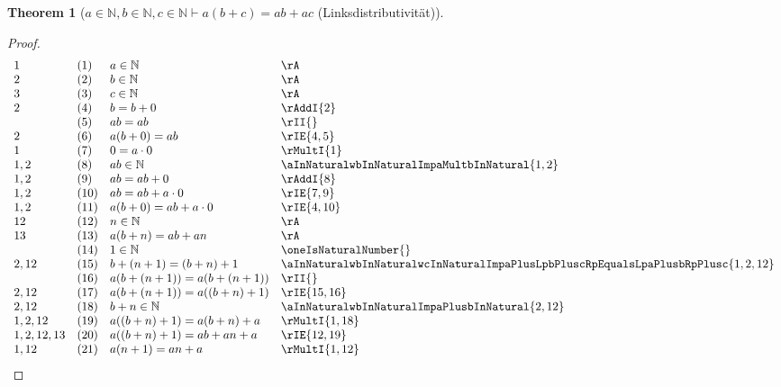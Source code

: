 \documentclass{book}
\theoremstyle{plain}
\newtheorem{theorem}{Theorem}
\theoremstyle{remark}
\theoremstyle{definition}
\begin{document}
\label{aInNaturalwbInNaturalwcInNaturalImpaLpbPluscRpEqualsabPlusac}
\begin{theorem}[\(a\in\mathbb{N},b\in\mathbb{N},c\in\mathbb{N}\vdash a(b+c)=ab+ac\) (Linksdistributivität)]
\end{theorem}
\begin{proof}
        \[
	\begin{array}{llll}
            1           &  (1) & a\in\mathbb{N} & \rA \\
            2           &  (2) & b\in\mathbb{N} & \rA \\
            3           &  (3) & c\in\mathbb{N} & \rA \\
            2           &  (4) & b=b+0 & \rAddI{2} \\
                        &  (5) & ab=ab & \rII{} \\
            2           &  (6) & a(b+0)=ab & \rIE{4,5} \\
            1           &  (7) & 0=a\cdot 0 & \rMultI{1} \\
            1,2         &  (8) & ab\in\mathbb{N} & \aInNaturalwbInNaturalImpaMultbInNatural{1,2} \\
            1,2         &  (9) & ab=ab+0 & \rAddI{8} \\
            1,2         &  (10) & ab=ab+a\cdot 0 & \rIE{7,9} \\
            1,2         &  (11) & a(b+0)=ab+a\cdot 0 & \rIE{4,10} \\
            12          &  (12) & n\in\mathbb{N} & \rA \\
            13          &  (13) & a(b+n)=ab+an & \rA \\
                        &  (14) & 1\in\mathbb{N} & \oneIsNaturalNumber{} \\
            2,12        &  (15) & b+(n+1)=(b+n)+1 & \aInNaturalwbInNaturalwcInNaturalImpaPlusLpbPluscRpEqualsLpaPlusbRpPlusc{1,2,12} \\
                        &  (16) & a(b+(n+1))=a(b+(n+1)) & \rII{} \\
            2,12        &  (17) & a(b+(n+1))=a((b+n)+1) & \rIE{15,16} \\
            2,12        &  (18) & b+n\in\mathbb{N} & \aInNaturalwbInNaturalImpaPlusbInNatural{2,12} \\
            1,2,12      &  (19) & a((b+n)+1)=a(b+n)+a & \rMultI{1,18} \\
            1,2,12,13   &  (20) & a((b+n)+1)=ab+an+a & \rIE{12,19} \\
            1,12        &  (21) & a(n+1)=an+a & \rMultI{1,12} \\

\end{array}\]
\end{proof}
\end{document}
